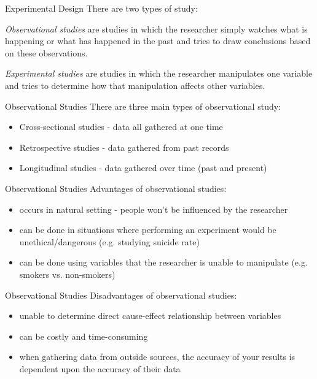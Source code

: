\documentclass[t]{beamer}
\newcommand{\?}{\stackrel{?}{=}}
\begin{document}
	\begin{frame}{Experimental Design}
		There are two types of study: \pause
		
		\textit{Observational studies} are studies in which the researcher simply watches what is happening or what has happened in the past and tries to draw conclusions based on these observations. \pause
		
		\textit{Experimental studies} are studies in which the researcher manipulates one variable and tries to determine how that manipulation affects other variables.
	\end{frame}

	\begin{frame}{Observational Studies}
		There are three main types of observational study: \begin{itemize}[<+->]
			\item Cross-sectional studies - data all gathered at one time
			\item Retrospective studies - data gathered from past records
			\item Longitudinal studies - data gathered over time (past and present)
		\end{itemize}
	\end{frame}

	\begin{frame}{Observational Studies}
		Advantages of observational studies: \begin{itemize}
			\item occurs in natural setting - people won't be influenced by the researcher
			\item can be done in situations where performing an experiment would be unethical/dangerous (e.g. studying suicide rate)
			\item can be done using variables that the researcher is unable to manipulate (e.g. smokers vs. non-smokers)
		\end{itemize}
	\end{frame}

	\begin{frame}{Observational Studies}
		Disadvantages of observational studies: \begin{itemize}
			\item unable to determine direct cause-effect relationship between variables
			\item can be costly and time-consuming
			\item when gathering data from outside sources, the accuracy of your results is dependent upon the accuracy of their data
		\end{itemize}
	\end{frame}
\end{document}
